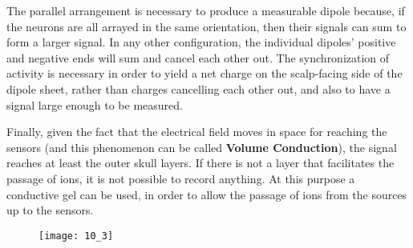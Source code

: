 The parallel arrangement is necessary to produce a measurable 
dipole because, if the neurons are all arrayed in the same orientation, then their signals can sum to form a larger 
signal. In any other configuration, the individual dipoles' positive and negative ends will sum and cancel each other 
out. The synchronization of activity is necessary in order to yield a net charge on the scalp-facing side of the 
dipole sheet, rather than charges cancelling each other out, and also to have a signal large enough to be measured.
\par\medskip
Finally, given the fact that the electrical field moves in space for reaching the sensors (and this phenomenon can 
be called \textbf{Volume Conduction}), the signal reaches at least the outer skull layers. If there is not a layer 
that facilitates the passage of ions, it is not possible to record anything. At this purpose a conductive gel can 
be used, in order to allow the passage of ions from the sources up to the sensors.
\begin{figure}[H]
    \texttt{[image: 10\_3]}
    \centering
\end{figure}

